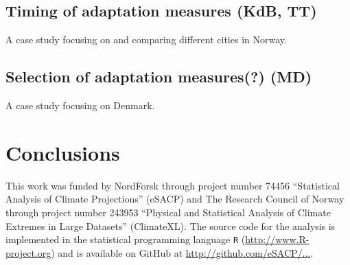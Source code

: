 \documentclass[wrr, draft]{agutex}
\begin{document}
\begin{article}
\subsection{Timing of adaptation measures {\color{blue} (KdB, TT)}}

A case study focusing on and comparing different cities in Norway.

\subsection{Selection of adaptation measures(?) {\color{blue} (MD)}}

A case study focusing on Denmark. 

\section{Conclusions}

\begin{acknowledgments}
This work was funded by NordForsk through project number 74456 ``Statistical Analysis of Climate Projections'' (eSACP) and The Research Council of Norway through project number 243953 ``Physical and Statistical Analysis of Climate Extremes in Large Datasets'' (ClimateXL). The source code for the analysis is implemented in the statistical programming language {\tt R} (\url{http://www.R-project.org}) and is available on GitHub at \url{http://github.com/eSACP/...}.
\end{acknowledgments}







\end{article}

\end{document}
